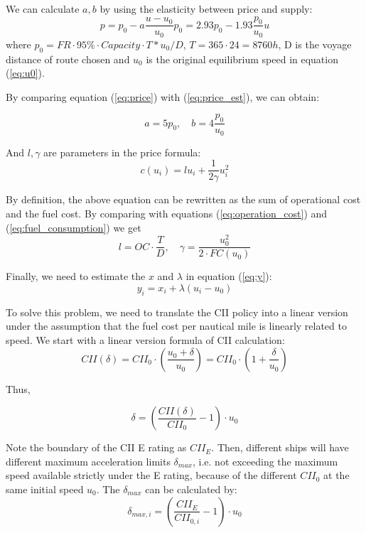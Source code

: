 \documentclass[a4paper,12pt]{article}
\begin{document}
We can calculate $a,b$ by using the elasticity between price and supply:
\begin{equation}
	\label{eq:price_est}
	p = p_0  - a \dfrac{u-u_0}{u_0} p_0 = 2.93 p_0 - 1.93 \dfrac{p_0}{u_0}u
\end{equation}
where $p_0 = FR \cdot 95\% \cdot Capacity \cdot T * u_0 / D$, $T = 365 \cdot 24 = 8760 h$, D is the voyage distance of route chosen and $u_0$ is the original equilibrium speed in equation (\ref{eq:u0}).

By comparing equation (\ref{eq:price}) with (\ref{eq:price_est}), we can obtain:

\begin{equation}
	a = 5p_0, \quad b = 4 \dfrac{p_0}{u_0}
\end{equation}

And $l, \gamma$ are parameters in the price formula:
\begin{equation*}
	c(u_i) = l u_i + \frac{1}{2 \gamma} u_i^2
\end{equation*}

By definition, the above equation can be rewritten as the sum of operational cost and the fuel cost. By comparing with equations (\ref{eq:operation_cost}) and (\ref{eq:fuel_consumption}) we get
\begin{equation}
	l = OC \cdot \dfrac{T}{D}, \quad \gamma = \dfrac{u_0^2}{2\cdot FC(u_0)}
\end{equation}

Finally, we need to estimate the $x$ and $\lambda$ in equation (\ref{eq:y}):
\begin{equation*}
	y_i = x_i + \lambda(u_i-u_0)
\end{equation*}

To solve this problem, we need to translate the CII policy into a linear version under the assumption that the fuel cost per nautical mile is linearly related to speed.
We start with a linear version formula of CII calculation:
\begin{equation}
	\label{eq:cii_linear}
	CII(\delta) = CII_0\cdot (\dfrac{u_0+\delta}{u_0})=CII_0\cdot (1 + \dfrac{\delta}{u_0})
\end{equation}

Thus,

\begin{equation}
	\delta = \left( \dfrac{CII(\delta)}{CII_0} -1 \right) \cdot u_0
\end{equation}

Note the boundary of the CII E rating as $CII_E$.
Then, different ships will have different maximum acceleration limits $\delta_{max}$, i.e. not exceeding the maximum speed available strictly under the E rating, because of the different $CII_0$ at the same initial speed $u_0$. The $\delta_{max}$ can be calculated by:
\begin{equation}
	\delta_{max,i} = \left( \dfrac{CII_E}{CII_{0,i}} -1 \right) \cdot u_0
\end{equation}
\end{document}
